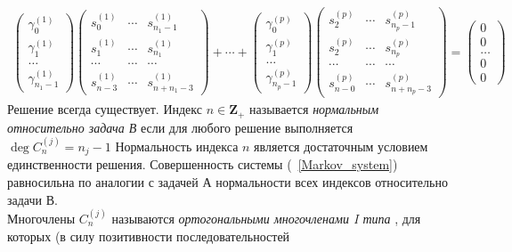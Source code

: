 \begin{eqnarray}
\left(
\begin{array}{cccccccc}
\gamma_0^{(1)} \\ \gamma_1^{(1)} \\ \ldots \\
\gamma_{n_1-1}^{(1)}
\end{array}
\right) \left(
\begin{array}{ccccccccccc}
s_0^{(1)}       & \cdots        & s_{n_1-1}^{(1)}     \\
s_1^{(1)}       & \cdots        & s_{n_1}^{(1)} \\
\cdots          & \cdots        & \cdots  \\
s_{n-3}^{(1)}   & \cdots        & s_{n+n_1-3}^{(1)}
\end{array} \right)
+\cdots+ \left(
\begin{array}{cccccccc}
\gamma_0^{(p)} \\ \gamma_1^{(p)} \\ \ldots \\
\gamma_{n_p-1}^{(p)}
\end{array}
\right) \left(
\begin{array}{ccccccccccc}
s_2^{(p)}       & \cdots        & s_{n_p-1}^{(p)}     \\
s_2^{(p)}       & \cdots        & s_{n_p}^{(p)} \\
\cdots          & \cdots        & \cdots  \\
s_{n-0}^{(p)}   & \cdots        & s_{n+n_p-3}^{(p)}
\end{array} \right)
= \left(
\begin{array}{cccccccc}
0 \\ 0 \\ \ldots \\ 0 \\ 0
\end{array}
\right) \nonumber
\end{eqnarray}
Решение всегда существует. Индекс $n\in \textbf{Z} _{+}$ называется
\textit{нормальным относительно задача В } если для любого решение
выполняется $\deg  C_n^{(j)} = n_j-1$ Нормальность индекса $n$
является достаточным условием единственности решения.
Совершенность системы (~\ref{Markov_system}) равносильна по
аналогии с задачей А
нормальности всех индексов относительно задачи В. \\
Многочлены $C^{(j)}_n$ называются \textit{ортогональными многочленами
I типа } , для которых (в силу позитивности последовательностей
